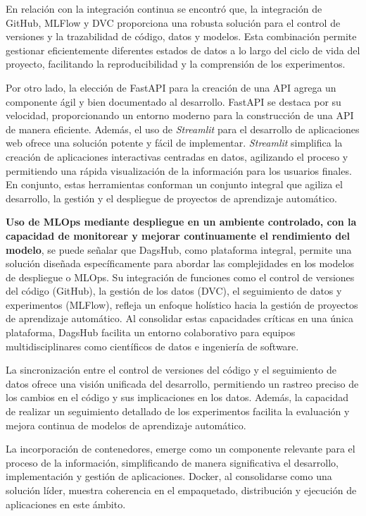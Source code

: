 En relación con la integración continua se encontró que, la integración de GitHub, MLFlow y DVC  proporciona una robusta solución para el control de versiones y la trazabilidad de código, datos y modelos. Esta combinación permite gestionar eficientemente diferentes estados de datos a lo largo del ciclo de vida del proyecto, facilitando la reproducibilidad y la comprensión de los experimentos.

Por otro lado, la elección de FastAPI para la creación de una API agrega un componente ágil y bien documentado al desarrollo. FastAPI se destaca por su velocidad, proporcionando un entorno moderno para la construcción de una API de manera eficiente. Además, el uso de \textit{Streamlit} para el desarrollo de aplicaciones web ofrece una solución potente y fácil de implementar. \textit{Streamlit} simplifica la creación de aplicaciones interactivas centradas en datos, agilizando el proceso y permitiendo una rápida visualización de la información para los usuarios finales. En conjunto, estas herramientas conforman un conjunto integral que agiliza el desarrollo, la gestión y el despliegue de proyectos de aprendizaje automático. \newline

\textbf{Uso de MLOps mediante despliegue en un ambiente controlado, con la capacidad de monitorear y mejorar continuamente el rendimiento del modelo}, se puede señalar que DagsHub, como plataforma integral, permite una solución diseñada específicamente para abordar las complejidades en los modelos de despliegue o MLOps. Su integración de funciones como el control de versiones del código (GitHub), la gestión de los datos (DVC), el seguimiento de datos y experimentos (MLFlow), refleja un enfoque holístico hacia la gestión de proyectos de aprendizaje automático. Al consolidar estas capacidades críticas en una única plataforma, DagsHub facilita un entorno colaborativo para equipos multidisciplinares como científicos de datos e ingeniería de software.

\newpage

La sincronización entre el control de versiones del código y el seguimiento de datos ofrece una visión unificada del desarrollo, permitiendo un rastreo preciso de los cambios en el código y sus implicaciones en los datos. Además, la capacidad de realizar un seguimiento detallado de los experimentos facilita la evaluación y mejora continua de modelos de aprendizaje automático.

La incorporación de contenedores, emerge como un componente relevante para el proceso de la información, simplificando de manera significativa el desarrollo, implementación y gestión de aplicaciones. Docker, al consolidarse como una solución líder, muestra coherencia en el empaquetado, distribución y ejecución de aplicaciones en este ámbito.

